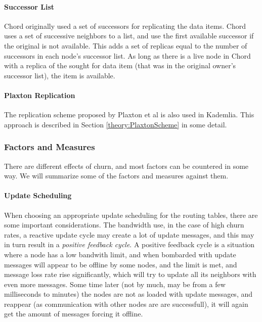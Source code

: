 \paragraph{Successor List}
Chord originally used a set of successors for replicating the data
 items\cite{stoica-01-chord}.
 Chord uses a set of successive neighbors to a list, and use the first
 available successor if the original is not available. This adds a set of
 replicas equal to the number of successors in each node's successor list.
 As long as there is a live node in Chord with a replica of the sought for
 data item (that was in the original owner's successor list), the item is
 available.

\paragraph{Plaxton Replication}
The replication scheme proposed by Plaxton et al\cite{plaxton-97-accessing-nearby} is
 also used in Kademlia. This approach is described in Section \ref{theory:PlaxtonScheme} in
 some detail.

\subsubsection{Factors and Measures}

There are different effects of churn, and most factors can be countered in some way.
 We will summarize some of the factors and measures against them.

\paragraph{Update Scheduling}

When choosing an appropriate update scheduling for the routing tables, there are some
 important considerations. The bandwidth use, in the case of high churn
 rates, a reactive update cycle may create a lot of update messages, and this may in
 turn result in a \emph{positive feedback cycle}. A positive feedback cycle is a
 situation where a node has a low bandwith limit, and when bombarded with update messages
 will appear to be offline by some nodes, and the limit is met, and message loss rate
 rise significantly, which will try to update all its neighbors
 with even more messages. Some time later (not by much, may be from a few milliseconds
 to minutes) the nodes are not as loaded with update messages, and reappear (as
 communication with other nodes are are successfull), it will again get the amount
 of messages forcing it offline.


